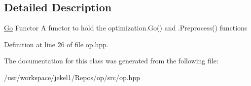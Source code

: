 \subsection{Detailed Description}
\hyperlink{classop_1_1Go}{Go} Functor A functor to hold the optimization.\-Go() and .Preprocess() functions 

Definition at line 26 of file op.\-hpp.



The documentation for this class was generated from the following file\-:\begin{DoxyCompactItemize}
\item 
/usr/workspace/jekel1/\-Repos/op/src/op.\-hpp\end{DoxyCompactItemize}
